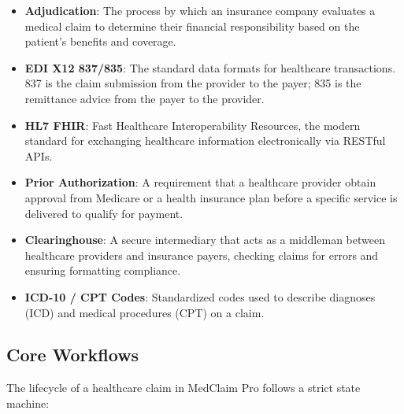 \begin{itemize}
\tightlist
\item
  \textbf{Adjudication}: The process by which an insurance company
  evaluates a medical claim to determine their financial responsibility
  based on the patient's benefits and coverage.
\item
  \textbf{EDI X12 837/835}: The standard data formats for healthcare
  transactions. 837 is the claim submission from the provider to the
  payer; 835 is the remittance advice from the payer to the provider.
\item
  \textbf{HL7 FHIR}: Fast Healthcare Interoperability Resources, the
  modern standard for exchanging healthcare information electronically
  via RESTful APIs.
\item
  \textbf{Prior Authorization}: A requirement that a healthcare provider
  obtain approval from Medicare or a health insurance plan before a
  specific service is delivered to qualify for payment.
\item
  \textbf{Clearinghouse}: A secure intermediary that acts as a middleman
  between healthcare providers and insurance payers, checking claims for
  errors and ensuring formatting compliance.
\item
  \textbf{ICD-10 / CPT Codes}: Standardized codes used to describe
  diagnoses (ICD) and medical procedures (CPT) on a claim.
\end{itemize}

\subsection{Core Workflows}\label{core-workflows}

The lifecycle of a healthcare claim in MedClaim Pro follows a strict
state machine:

